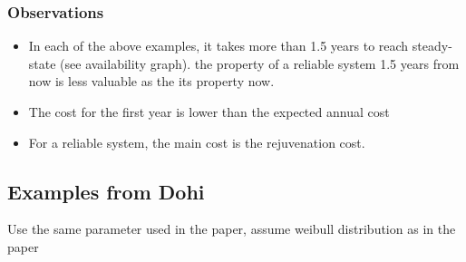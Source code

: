 \subsubsection{Observations}


\begin{itemize}
  \item In each of the above examples, it takes more than 1.5 years to reach steady-state (see availability graph).
  the property of a reliable system 1.5 years from now is less valuable as the its property now.
  \item The cost for the first year is lower than the expected annual cost
  \item For a reliable system, the main cost is the rejuvenation cost.
\end{itemize}



\subsection{Examples from Dohi}

Use the same parameter used in the paper, assume weibull distribution as in the paper


